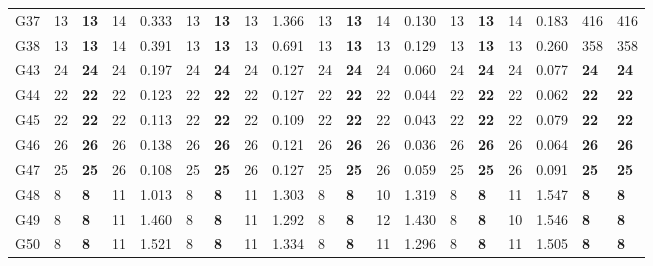 \documentclass[12pt, a4paper]{article}%
\numberwithin{equation}{section}
\theoremstyle{plain}
\begin{document}
{\begin{landscape}
\begin{longtable}{lllllllllllllllllll}
						G37                       & 13   & \textbf{13} & 14  & 0.333  & 13   & \textbf{13} & 13  & 1.366  & 13   & \textbf{13} & 14  & 0.130  & 13   & \textbf{13} & 14  & 0.183   & 416                     & 416                  \\
						G38                       & 13   & \textbf{13} & 14  & 0.391  & 13   & \textbf{13} & 13  & 0.691  & 13   & \textbf{13} & 13  & 0.129  & 13   & \textbf{13} & 13  & 0.260   & 358                     & 358                  \\
						G43                       & 24   & \textbf{24} & 24  & 0.197  & 24   & \textbf{24} & 24  & 0.127  & 24   & \textbf{24} & 24  & 0.060  & 24   & \textbf{24} & 24  & 0.077   & \textbf{24}             & \textbf{24}          \\
						G44                       & 22   & \textbf{22} & 22  & 0.123  & 22   & \textbf{22} & 22  & 0.127  & 22   & \textbf{22} & 22  & 0.044  & 22   & \textbf{22} & 22  & 0.062   & \textbf{22}             & \textbf{22}          \\
						G45                       & 22   & \textbf{22} & 22  & 0.113  & 22   & \textbf{22} & 22  & 0.109  & 22   & \textbf{22} & 22  & 0.043  & 22   & \textbf{22} & 22  & 0.079   & \textbf{22}             & \textbf{22}          \\
						G46                       & 26   & \textbf{26} & 26  & 0.138  & 26   & \textbf{26} & 26  & 0.121  & 26   & \textbf{26} & 26  & 0.036  & 26   & \textbf{26} & 26  & 0.064   & \textbf{26}             & \textbf{26}          \\
						G47                       & 25   & \textbf{25} & 26  & 0.108  & 25   & \textbf{25} & 26  & 0.127  & 25   & \textbf{25} & 26  & 0.059  & 25   & \textbf{25} & 26  & 0.091   & \textbf{25}             & \textbf{25}          \\
						G48                       & 8    & \textbf{8}  & 11  & 1.013  & 8    & \textbf{8}  & 11  & 1.303  & 8    & \textbf{8}  & 10  & 1.319  & 8    & \textbf{8}  & 11  & 1.547   & \textbf{8}              & \textbf{8}           \\
						G49                       & 8    & \textbf{8}  & 11  & 1.460  & 8    & \textbf{8}  & 11  & 1.292  & 8    & \textbf{8}  & 12  & 1.430  & 8    & \textbf{8}  & 10  & 1.546   & \textbf{8}              & \textbf{8}           \\
						G50                       & 8    & \textbf{8}  & 11  & 1.521  & 8    & \textbf{8}  & 11  & 1.334  & 8    & \textbf{8}  & 11  & 1.296  & 8    & \textbf{8}  & 11  & 1.505   & \textbf{8}              & \textbf{8}           \\

\end{longtable}
\end{landscape}}
\end{document}
